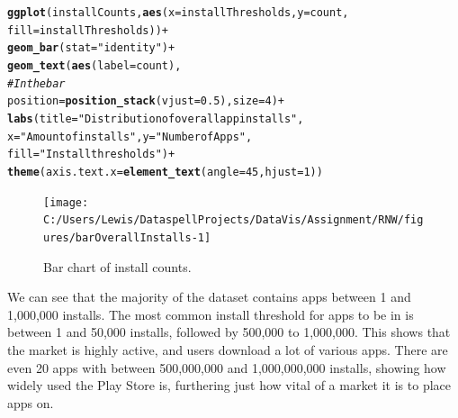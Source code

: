 \documentclass[12pt]{report}\usepackage[]{graphicx}\usepackage[]{xcolor}
\makeatletter
\newcommand{\hlnum}[1]{\textcolor[rgb]{0.686,0.059,0.569}{#1}}%
\newcommand{\hlstr}[1]{\textcolor[rgb]{0.192,0.494,0.8}{#1}}%
\newcommand{\hlcom}[1]{\textcolor[rgb]{0.678,0.584,0.686}{\textit{#1}}}%
\newcommand{\hlopt}[1]{\textcolor[rgb]{0,0,0}{#1}}%
\newcommand{\hlstd}[1]{\textcolor[rgb]{0.345,0.345,0.345}{#1}}%
\newcommand{\hlkwc}[1]{\textcolor[rgb]{0.333,0.667,0.333}{#1}}%
\newcommand{\hlkwd}[1]{\textcolor[rgb]{0.737,0.353,0.396}{\textbf{#1}}}%
\newenvironment{kframe}{%
 \def\at@end@of@kframe{}%
 \ifinner\ifhmode%
  \def\at@end@of@kframe{\end{minipage}}%
  \begin{minipage}{\columnwidth}%
 \fi\fi%
 \def\FrameCommand##1{\hskip\@totalleftmargin \hskip-\fboxsep
 \colorbox{shadecolor}{##1}\hskip-\fboxsep
     \hskip-\linewidth \hskip-\@totalleftmargin \hskip\columnwidth}%
 \MakeFramed {\advance\hsize-\width
   \@totalleftmargin\z@ \linewidth\hsize
   \@setminipage}}%
 {\par\unskip\endMakeFramed%
 \at@end@of@kframe}
\newenvironment{knitrout}{}{} %
\makeatother
\begin{document}
\begin{knitrout}
\begin{kframe}
\begin{alltt}
\hlkwd{ggplot}\hlstd{(installCounts,} \hlkwd{aes}\hlstd{(}\hlkwc{x} \hlstd{= installThresholds,} \hlkwc{y} \hlstd{= count,}
                          \hlkwc{fill} \hlstd{= installThresholds))} \hlopt{+}
\hlkwd{geom_bar}\hlstd{(}\hlkwc{stat} \hlstd{=} \hlstr{"identity"}\hlstd{)} \hlopt{+}
\hlkwd{geom_text}\hlstd{(}\hlkwd{aes}\hlstd{(}\hlkwc{label} \hlstd{= count),}
        \hlcom{# In the bar}
        \hlkwc{position} \hlstd{=} \hlkwd{position_stack}\hlstd{(}\hlkwc{vjust} \hlstd{=} \hlnum{0.5}\hlstd{),} \hlkwc{size} \hlstd{=} \hlnum{4}\hlstd{)} \hlopt{+}
\hlkwd{labs}\hlstd{(}\hlkwc{title} \hlstd{=} \hlstr{"Distribution of overall app installs"}\hlstd{,}
     \hlkwc{x} \hlstd{=} \hlstr{"Amount of installs"}\hlstd{,} \hlkwc{y} \hlstd{=} \hlstr{"Number of Apps"}\hlstd{,}
     \hlkwc{fill} \hlstd{=} \hlstr{"Install thresholds"}\hlstd{)} \hlopt{+}
\hlkwd{theme}\hlstd{(}\hlkwc{axis.text.x} \hlstd{=} \hlkwd{element_text}\hlstd{(}\hlkwc{angle} \hlstd{=}\hlnum{45}\hlstd{,} \hlkwc{hjust} \hlstd{=} \hlnum{1}\hlstd{))}
\end{alltt}
\end{kframe}\begin{figure}[H]

{\centering \texttt{[image: C:/Users/Lewis/DataspellProjects/DataVis/Assignment/RNW/figures/barOverallInstalls-1]} 

}

\caption[Bar chart of install counts]{Bar chart of install counts.}\label{fig:barOverallInstalls}
\end{figure}

\end{knitrout}

We can see that the majority of the dataset contains apps between 1 and 1,000,000 installs. The most common
install threshold for apps to be in is between 1 and 50,000 installs, followed by 500,000 to 1,000,000. This
shows that the market is highly active, and users download a lot of various apps. There are even 20 apps with 
between 500,000,000 and 1,000,000,000 installs, showing how widely used the Play Store is, furthering just how
vital of a market it is to place apps on. 
\end{document}
